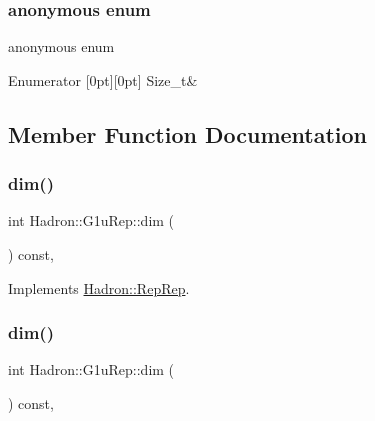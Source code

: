 \subsubsection{\texorpdfstring{anonymous enum}{anonymous enum}}
{\footnotesize\ttfamily anonymous enum}

\begin{DoxyEnumFields}{Enumerator}
[0pt][0pt]{}\mbox{\label{structHadron_1_1G1uRep_a94af5a61531cd87bfcc54e46d848ef64abf1e4b770795e8da7f7f8752d09ddc41}} 
Size\+\_\+t&\\
\hline

\end{DoxyEnumFields}


\subsection{Member Function Documentation}
\mbox{\label{structHadron_1_1G1uRep_a13d30ff40203d77d9beacee3e48dbbd7}} 
\subsubsection{\texorpdfstring{dim()}{dim()}\hspace{0.1cm}{\footnotesize\ttfamily [1/3]}}
{\footnotesize\ttfamily int Hadron\+::\+G1u\+Rep\+::dim (\begin{DoxyParamCaption}{ }\end{DoxyParamCaption}) const\hspace{0.3cm}{\ttfamily [inline]}, {\ttfamily [virtual]}}



Implements \mbox{\hyperlink{structHadron_1_1RepRep_a92c8802e5ed7afd7da43ccfd5b7cd92b}{Hadron\+::\+Rep\+Rep}}.

\mbox{\label{structHadron_1_1G1uRep_a13d30ff40203d77d9beacee3e48dbbd7}} 
\subsubsection{\texorpdfstring{dim()}{dim()}\hspace{0.1cm}{\footnotesize\ttfamily [2/3]}}
{\footnotesize\ttfamily int Hadron\+::\+G1u\+Rep\+::dim (\begin{DoxyParamCaption}{ }\end{DoxyParamCaption}) const\hspace{0.3cm}{\ttfamily [inline]}, {\ttfamily [virtual]}}



